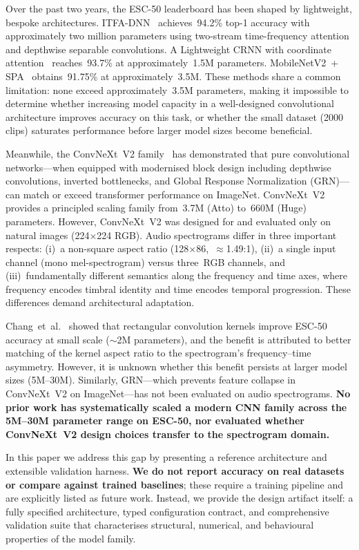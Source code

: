 \documentclass{article}
\begin{document}
Over the past two years, the ESC-50 leaderboard has been shaped by lightweight,
bespoke architectures. ITFA-DNN~\citep{chen2025itfa} achieves~94.2\% top-1
accuracy with approximately two million parameters using two-stream
time-frequency attention and depthwise separable convolutions. A Lightweight
CRNN with coordinate attention~\citep{crnncoordatt2026} reaches~93.7\% at
approximately~1.5M parameters. MobileNetV2~+
SPA~\citep{mobilenetv2spa2025} obtains~91.75\% at approximately~3.5M. These
methods share a common limitation: none exceed approximately~3.5M parameters,
making it impossible to determine whether increasing model capacity in a
well-designed convolutional architecture improves accuracy on this task, or
whether the small dataset (2000 clips) saturates performance before larger
model sizes become beneficial.

Meanwhile, the ConvNeXt~V2 family~\citep{woo2023convnextv2} has demonstrated
that pure convolutional networks---when equipped with modernised block design
including depthwise convolutions, inverted bottlenecks, and Global Response
Normalization (GRN)---can match or exceed transformer performance on ImageNet.
ConvNeXt~V2 provides a principled scaling family from~3.7M (Atto) to~660M
(Huge) parameters. However, ConvNeXt~V2 was designed for and evaluated only on
natural images (224$\times$224 RGB). Audio spectrograms differ in three
important respects: (i)~a non-square aspect ratio (128$\times$86,~$\approx$1.49:1),
(ii)~a single input channel (mono mel-spectrogram) versus three~RGB channels,
and (iii)~fundamentally different semantics along the frequency and time axes,
where frequency encodes timbral identity and time encodes temporal progression.
These differences demand architectural adaptation.

Chang~et~al.~\citep{chang2026rectangular} showed that rectangular convolution
kernels improve ESC-50 accuracy at small scale ($\sim$2M parameters), and the
benefit is attributed to better matching of the kernel aspect ratio to the
spectrogram's frequency--time asymmetry. However, it is unknown whether this
benefit persists at larger model sizes (5M--30M). Similarly, GRN---which
prevents feature collapse in ConvNeXt~V2 on ImageNet---has not been evaluated
on audio spectrograms. \textbf{No prior work has systematically scaled a modern
CNN family across the 5M--30M parameter range on ESC-50, nor evaluated whether
ConvNeXt~V2 design choices transfer to the spectrogram domain.}

In this paper we address this gap by presenting a reference architecture and
extensible validation harness. \textbf{We do not report accuracy on real
datasets or compare against trained baselines}; these require a training
pipeline and are explicitly listed as future work. Instead, we provide the
design artifact itself: a fully specified architecture, typed configuration
contract, and comprehensive validation suite that characterises structural,
numerical, and behavioural properties of the model family.
\end{document}
